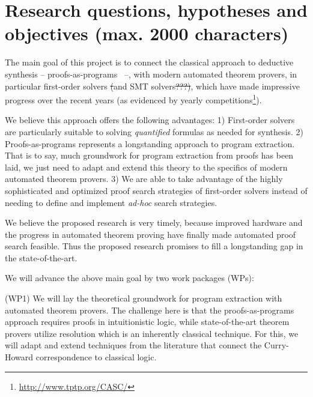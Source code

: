 \documentclass[a4paper,12pt]{article}
\begin{document}
\section{Research questions, hypotheses and objectives (max. 2000 characters)}

The main goal of this project is to connect the classical approach to deductive synthesis --  proofs-as-programs~\cite{girard1989proofs} --, with modern automated theorem provers, in particular first-order solvers \sout{(}and SMT solvers\sout{???)}, which have made impressive progress over the recent years (as evidenced by yearly competitions\footnote{\url{http://www.tptp.org/CASC/}}).

We believe this approach offers the following advantages:
1) First-order solvers are particularly suitable to solving \emph{quantified} formulas as needed for synthesis.
2) Proofs-as-programs represents a longstanding approach to program extraction.
That is to say, much groundwork for program extraction from proofs has been laid, we just need to adapt and extend this theory to the specifics of modern automated theorem provers.
3) We are able to take advantage of the highly sophisticated and optimized proof search strategies of first-order solvers instead of needing to define and implement \emph{ad-hoc} search strategies.

We believe the proposed research is very timely, because improved hardware and the progress in automated theorem proving have finally made automated proof search feasible.
Thus the proposed research promises to fill a longstanding gap in the state-of-the-art.

We will advance the above main goal by two work packages (WPs):

(WP1) We will lay the theoretical groundwork for program extraction with automated theorem provers.
The challenge here is that the proofs-as-programs approach requires proofs in intuitionistic logic, while state-of-the-art theorem provers
utilize resolution which is an inherently classical technique.
For this, we will adapt and extend techniques from the literature that connect the Curry-Howard correspondence to classical logic.
\end{document}
